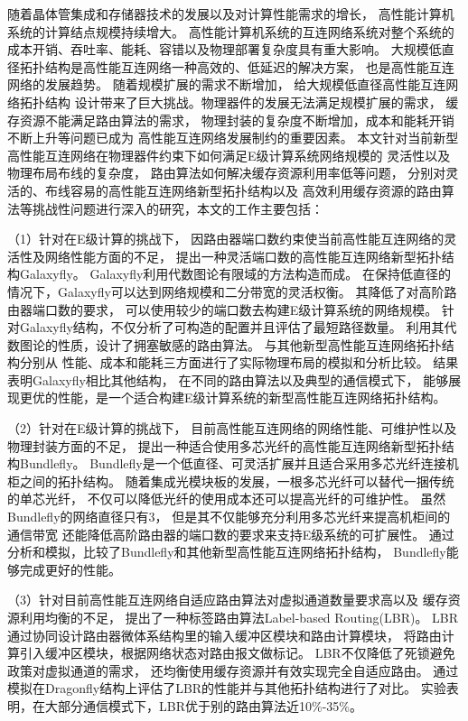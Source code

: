 \begin{cabstract}
  随着晶体管集成和存储器技术的发展以及对计算性能需求的增长，
  高性能计算机系统的计算结点规模持续增大。
  高性能计算机系统的互连网络系统对整个系统的
  成本开销、吞吐率、能耗、容错以及物理部署复杂度具有重大影响。
  大规模低直径拓扑结构是高性能互连网络一种高效的、低延迟的解决方案，
  也是高性能互连网络的发展趋势。
  随着规模扩展的需求不断增加，
  给大规模低直径高性能互连网络拓扑结构
  设计带来了巨大挑战。物理器件的发展无法满足规模扩展的需求，
  缓存资源不能满足路由算法的需求，
  物理封装的复杂度不断增加，成本和能耗开销不断上升等问题已成为
  高性能互连网络发展制约的重要因素。
  本文针对当前新型高性能互连网络在物理器件约束下如何满足E级计算系统网络规模的
  灵活性以及物理布局布线的复杂度，
  路由算法如何解决缓存资源利用率低等问题，
  分别对灵活的、布线容易的高性能互连网络新型拓扑结构以及
  高效利用缓存资源的路由算法等挑战性问题进行深入的研究，本文的工作主要包括：

  （1）针对在E级计算的挑战下，
  因路由器端口数约束使当前高性能互连网络的灵活性及网络性能方面的不足，
  提出一种灵活端口数的高性能互连网络新型拓扑结构Galaxyfly。
  Galaxyfly利用代数图论有限域的方法构造而成。
  在保持低直径的情况下，Galaxyfly可以达到网络规模和二分带宽的灵活权衡。
  其降低了对高阶路由器端口数的要求，
  可以使用较少的端口数去构建E级计算系统的网络规模。
  针对Galaxyfly结构，不仅分析了可构造的配置并且评估了最短路径数量。
  利用其代数图论的性质，设计了拥塞敏感的路由算法。
  与其他新型高性能互连网络拓扑结构分别从
  性能、成本和能耗三方面进行了实际物理布局的模拟和分析比较。
  结果表明Galaxyfly相比其他结构，
  在不同的路由算法以及典型的通信模式下，
  能够展现更优的性能，是一个适合构建E级计算系统的新型高性能互连网络拓扑结构。

  （2）针对在E级计算的挑战下，
  目前高性能互连网络的网络性能、可维护性以及物理封装方面的不足，
  提出一种适合使用多芯光纤的高性能互连网络新型拓扑结构Bundlefly。
  Bundlefly是一个低直径、可灵活扩展并且适合采用多芯光纤连接机柜之间的拓扑结构。
  随着集成光模块板的发展，一根多芯光纤可以替代一捆传统的单芯光纤，
  不仅可以降低光纤的使用成本还可以提高光纤的可维护性。
  虽然Bundlefly的网络直径只有3，
  但是其不仅能够充分利用多芯光纤来提高机柜间的通信带宽
  还能降低高阶路由器的端口数的要求来支持E级系统的可扩展性。
  通过分析和模拟，比较了Bundlefly和其他新型高性能互连网络拓扑结构，
  Bundlefly能够完成更好的性能。

  （3）针对目前高性能互连网络自适应路由算法对虚拟通道数量要求高以及
  缓存资源利用均衡的不足，
  提出了一种标签路由算法Label-based Routing(LBR)。
  LBR通过协同设计路由器微体系结构里的输入缓冲区模块和路由计算模块，
  将路由计算引入缓冲区模块，根据网络状态对路由报文做标记。
  LBR不仅降低了死锁避免政策对虚拟通道的需求，
  还均衡使用缓存资源并有效实现完全自适应路由。
  通过模拟在Dragonfly结构上评估了LBR的性能并与其他拓扑结构进行了对比。
  实验表明，在大部分通信模式下，LBR优于别的路由算法近10\%-35\%。


\end{cabstract}

